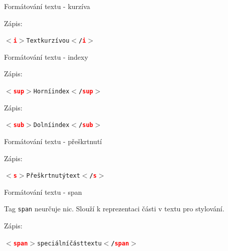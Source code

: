 \documentclass[aspectratio=1610]{beamer}
\begin{document}
\begin{frame}{Formátování textu - kurzíva}
    \begin{cardTiny}
        \begin{flushleft}
            Zápis: \begin{alltt}\textbf{$<$\textcolor{red}{i}$>$}Text kurzívou\textbf{$<$/\textcolor{red}{i}$>$}\end{alltt}
        \end{flushleft}
    \end{cardTiny}
\end{frame}

\begin{frame}{Formátování textu - indexy}
    \begin{cardTiny}
        \begin{flushleft}
            Zápis: \begin{alltt}\textbf{$<$\textcolor{red}{sup}$>$}Horní index\textbf{$<$/\textcolor{red}{sup}$>$}\end{alltt}
        \end{flushleft}
    \end{cardTiny}
    \begin{cardTiny}
        \begin{flushleft}
            Zápis: \begin{alltt}\textbf{$<$\textcolor{red}{sub}$>$}Dolní index\textbf{$<$/\textcolor{red}{sub}$>$}\end{alltt}
        \end{flushleft}
    \end{cardTiny}
\end{frame}

\begin{frame}{Formátování textu - přeškrtnutí}
    \begin{cardTiny}
        \begin{flushleft}
            Zápis: \begin{alltt}\textbf{$<$\textcolor{red}{s}$>$}Přeškrtnutý text\textbf{$<$/\textcolor{red}{s}$>$}\end{alltt}
        \end{flushleft}
    \end{cardTiny}
\end{frame}

\begin{frame}{Formátování textu - span}
    \begin{cardTiny}
        \begin{flushleft}
            Tag \texttt{span} neurčuje nic. Slouží k reprezentaci části v textu pro stylování.

            Zápis: \begin{alltt}\textbf{$<$\textcolor{red}{span}$>$}speciální část textu\textbf{$<$/\textcolor{red}{span}$>$}\end{alltt}
        \end{flushleft}
    \end{cardTiny}
\end{frame}
\end{document}

